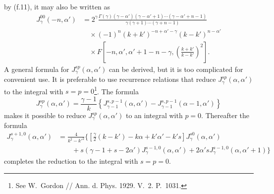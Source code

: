 by (f.11), it may also be written as
\begin{equation}
 \begin{split}
 J_\gamma^{00}(-n,\alpha')
 &=2^\gamma\frac{\Gamma(\gamma)(\gamma-\alpha')
 (\gamma-\alpha'+1)\cdots(\gamma-\alpha'+n-1)}
 {\gamma(\gamma+1)\cdots(\gamma+n-1)}\\
 &\hspace{1em}\times(-1)^n(k+k')^{-n+\alpha'-\gamma}
 (k-k')^{n-\alpha'}\\
 &\hspace{1em}\times F\left[-n,\alpha',\alpha'+1-n-\gamma,
 \left(\frac{k+k'}{k-k'}\right)^2\right].
 \end{split}
 \tag{f.14}
\end{equation}
A general formula for $J_\gamma^{sp}(\alpha,\alpha')$ can be derived, but it
is too complicated for convenient use. It is preferable to use recurrence
relations that reduce $J_\gamma^{sp}(\alpha,\alpha')$ to the integral with
$s=p=0$\footnote{See W.~Gordon // Ann. d. Phys. 1929. V.~2. P.~1031.}. The
formula
\begin{equation}
 J_\gamma^{sp}(\alpha,\alpha')=\frac{\gamma-1}{k}
 \left\{J_{\gamma-1}^{s,p-1}(\alpha,\alpha')
 -J_{\gamma-1}^{s,p-1}(\alpha-1,\alpha')\right\}
 \tag{f.15}
\end{equation}
makes it possible to reduce $J_\gamma^{sp}(\alpha,\alpha')$ to an integral
with $p=0$. Thereafter the formula
\begin{equation}
 \begin{split}
 J_\gamma^{s+1,0}(\alpha,\alpha')
 &=\frac4{k^2-k'^2}\Biggl\{
 \left[\frac\gamma2(k-k')-k\alpha+k'\alpha'-k's\right]
 J_\gamma^{s0}(\alpha,\alpha')\\
 &\hspace{2em}+s(\gamma-1+s-2\alpha')
 J_\gamma^{s-1,0}(\alpha,\alpha')
 +2\alpha'sJ_\gamma^{s-1,0}(\alpha,\alpha'+1)\Biggr\}
 \end{split}
 \tag{f.16}
\end{equation}
completes the reduction to the integral with $s=p=0$.
